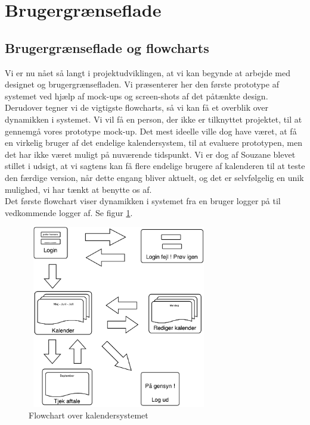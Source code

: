 \documentclass[12pt]{article}   %
\begin{document}
\section{Brugergrænseflade}
\subsection{Brugergrænseflade og flowcharts}
Vi er nu nået så langt i projektudviklingen, at vi kan begynde at arbejde med designet og brugergrænsefladen. Vi præsenterer her den første prototype af systemet ved hjælp af mock-ups og screen-shots af det påtænkte design. Derudover tegner vi de vigtigste flowcharts, så vi kan få et overblik over dynamikken i systemet. Vi vil få en person, der ikke er tilknyttet projektet, til at gennemgå vores prototype mock-up. Det mest ideelle ville dog have været, at få en virkelig bruger af det endelige kalendersystem, til at evaluere prototypen, men det har ikke været muligt på nuværende tidspunkt. Vi er dog af Souzane blevet stillet i udsigt, at vi sagtens kan få flere endelige brugere af kalenderen til at teste den færdige version, når dette engang bliver aktuelt, og det er selvfølgelig en unik mulighed, vi har tænkt at benytte os af. \\
Det første flowchart viser dynamikken i systemet fra en bruger logger på til vedkommende logger af. Se figur \ref{fig:flow1}.\\

\begin{figure}[!ht]
\begin{center}
\includegraphics[width=8cm, height=8cm]{flow1.pdf}
\caption{Flowchart over kalendersystemet}
\label{fig:flow1}
\end{center}
\end{figure}
\end{document}
